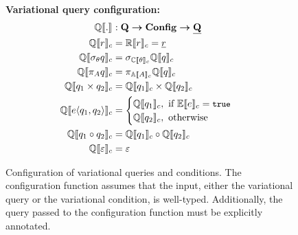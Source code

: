\begin{figure}
\medskip
\textbf{Variational query configuration:}
\begin{alignat*}{1}
\eeSem [] . &: \qSet \totype \confSet \totype \pQSet\\
%
\eeSem \vRel &= \orSem \vRel = \pRel\\
\eeSem {\vSel \vQ}  &= \vSel [\ecSem \vCond] {\eeSem \vQ}\\
%
\eeSem {\vPrj [\vAttList] \vQ} &= \vPrj [\olSem \vAttList] {\eeSem \vQ}\\
%
%
\eeSem {{\vQ_1} \times {\vQ_2}} &= \eeSem {\vQ_1} \times \eeSem {\vQ_2}\\
%
%
\eeSem {\chc {\vQ_1, \vQ_2}} &= 
	\begin{cases}
		\eeSem {\vQ_1}, \text{ if } \fSem \dimMeta = \t\\
		\eeSem {\vQ_2}, \text{ otherwise}
	\end{cases}\\
%
\eeSem {{\vQ_1} \circ {\vQ_2}} &= \eeSem {\vQ_1} \circ \eeSem {\vQ_2}\\
%
\eeSem {\empRel} &= \empPRel
\end{alignat*}
\caption[Configuration of variational queries and conditions]{Configuration of variational queries and conditions. 
The configuration function assumes that the input, either the variational query or the variational condition,
is well-typed. Additionally, the query passed to the configuration function must be explicitly
annotated. 
}
\label{fig:v-alg-conf-sem}
\end{figure}
